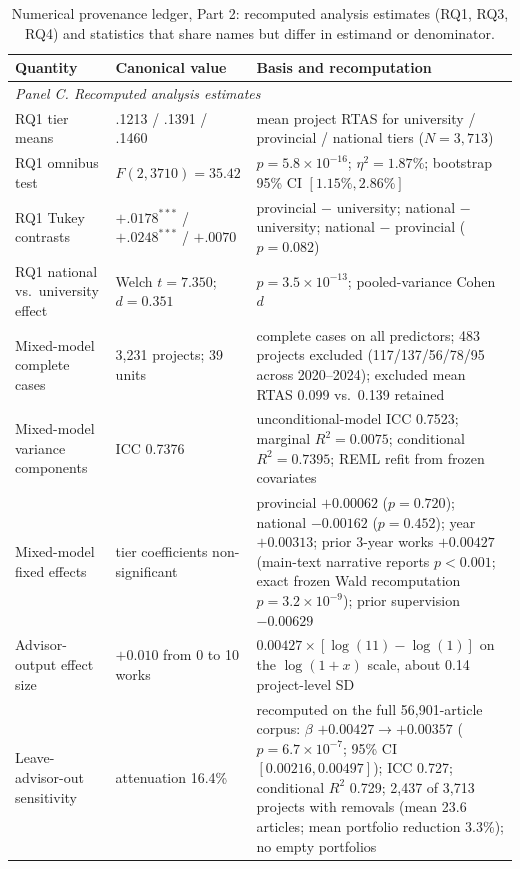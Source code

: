 \documentclass[a4paper,11pt]{article}
\begin{document}

\begin{table}[H]
\centering
\caption{Numerical provenance ledger, Part 2: recomputed analysis estimates (RQ1, RQ3, RQ4) and statistics that share names but differ in estimand or denominator.}
\label{tab:s5}
\scriptsize
\begin{tabular}{p{1.55in}p{1.05in}p{3.15in}}
\toprule
\textbf{Quantity} & \textbf{Canonical value} & \textbf{Basis and recomputation}\\
\midrule
\multicolumn{3}{l}{\textit{Panel C. Recomputed analysis estimates}}\\
\midrule
RQ1 tier means & .1213 / .1391 / .1460 & mean project RTAS for university / provincial / national tiers ($N=3{,}713$)\\
RQ1 omnibus test & $F(2,3710)=35.42$ & $p=5.8\times10^{-16}$; $\eta^2=1.87\%$; bootstrap 95\% CI $[1.15\%,2.86\%]$\\
RQ1 Tukey contrasts & $+.0178^{***}$ / $+.0248^{***}$ / $+.0070$ & provincial $-$ university; national $-$ university; national $-$ provincial ($p=0.082$)\\
RQ1 national vs.\ university effect & Welch $t=7.350$; $d=0.351$ & $p=3.5\times10^{-13}$; pooled-variance Cohen $d$\\
Mixed-model complete cases & 3,231 projects; 39 units & complete cases on all predictors; 483 projects excluded (117/137/56/78/95 across 2020--2024); excluded mean RTAS 0.099 vs.\ 0.139 retained\\
Mixed-model variance components & ICC 0.7376 & unconditional-model ICC 0.7523; marginal $R^2=0.0075$; conditional $R^2=0.7395$; REML refit from frozen covariates\\
Mixed-model fixed effects & tier coefficients non-significant & provincial $+0.00062$ ($p=0.720$); national $-0.00162$ ($p=0.452$); year $+0.00313$; prior 3-year works $+0.00427$ (main-text narrative reports $p<0.001$; exact frozen Wald recomputation $p=3.2\times10^{-9}$); prior supervision $-0.00629$\\
Advisor-output effect size & $+0.010$ from 0 to 10 works & $0.00427\times[\log(11)-\log(1)]$ on the $\log(1+x)$ scale, about 0.14 project-level SD\\
Leave-advisor-out sensitivity & attenuation 16.4\% & recomputed on the full 56,901-article corpus: $\beta$ $+0.00427\to+0.00357$ ($p=6.7\times10^{-7}$; 95\% CI $[0.00216,0.00497]$); ICC 0.727; conditional $R^2$ 0.729; 2,437 of 3,713 projects with removals (mean 23.6 articles; mean portfolio reduction 3.3\%); no empty portfolios\\

\end{tabular}
\end{table}
\end{document}
